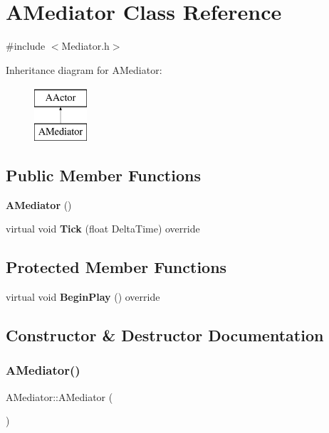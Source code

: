 \section{A\+Mediator Class Reference}
\label{class_a_mediator}


{\ttfamily \#include $<$Mediator.\+h$>$}

Inheritance diagram for A\+Mediator\+:\begin{figure}[H]
\begin{center}
\leavevmode
\includegraphics[height=2.000000cm]{class_a_mediator}
\end{center}
\end{figure}
\subsection*{Public Member Functions}
\begin{DoxyCompactItemize}
\item 
\textbf{ A\+Mediator} ()
\item 
virtual void \textbf{ Tick} (float Delta\+Time) override
\end{DoxyCompactItemize}
\subsection*{Protected Member Functions}
\begin{DoxyCompactItemize}
\item 
virtual void \textbf{ Begin\+Play} () override
\end{DoxyCompactItemize}


\subsection{Constructor \& Destructor Documentation}
\mbox{\label{class_a_mediator_a32084794be3bda3fc7a22e4388531ba4}} 
\subsubsection{AMediator()}
{\footnotesize\ttfamily A\+Mediator\+::\+A\+Mediator (\begin{DoxyParamCaption}{ }\end{DoxyParamCaption})}



